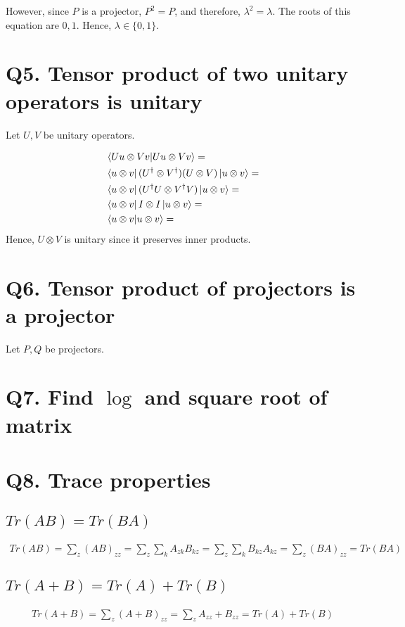 \documentclass[11pt]{book}
\begin{document}
However, since $P$ is a projector, $P^2 = P$, and therefore, $\lambda^2 = \lambda$.
The roots of this equation are $0, 1$. Hence, $\lambda \in \{0, 1\}$.

\section{Q5. Tensor product of two unitary operators is unitary}
Let $U, V$ be unitary operators.

\begin{align*}
    &\bra{U u \otimes V v} \ket{U u \otimes V v} = \\
    &\bra{u \otimes v} (U^\dagger \otimes V^\dagger) (U \otimes V) \ket{u \otimes v} =  \\
    &\bra{u \otimes v} (U^\dagger U \otimes V^\dagger V) \ket{u \otimes v} = \\
    &\bra{u \otimes v} I \otimes I \ket{u \otimes v} = \\
    &\bra{u \otimes v} \ket{u \otimes v} = \\
\end{align*}
Hence, $U \otimes V$ is unitary since it preserves inner products.

\section{Q6. Tensor product of projectors is a projector}
Let $P, Q$ be projectors. 
\section{Q7. Find $\log$ and square root of matrix}
\section{Q8. Trace properties}
\subsection{$Tr(AB) = Tr(BA)$}
\begin{align*}
    Tr(AB) = \sum_z (AB)_{zz} = \sum_z \sum_k A_{zk} B_{kz} = \sum_z \sum_k B_{kz} A_{kz} = \sum_z (BA)_{zz} = Tr(BA)
\end{align*}

\subsection{$Tr(A + B) = Tr(A) + Tr(B)$}
\begin{align*}
    Tr(A + B) = \sum_z (A + B)_{zz} = \sum_z A_{zz} + B_{zz} = Tr(A) + Tr(B)
\end{align*}
\end{document}

